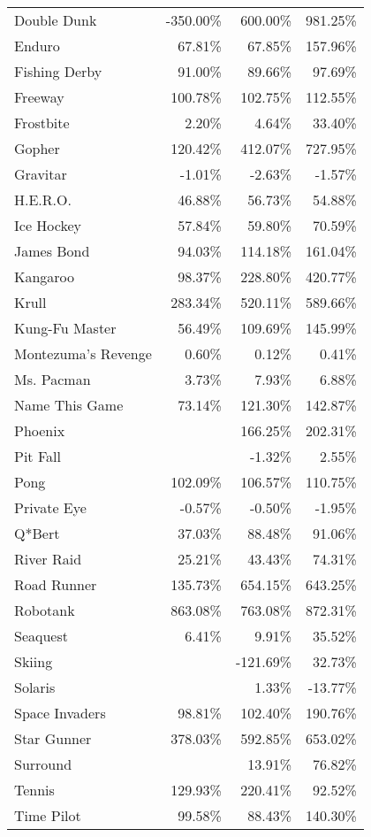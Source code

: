 \documentclass[letterpaper]{article}
\begin{document}
\begin{table*}[h]
\begin{tabular}{lrrr}
Double Dunk & -350.00\% & 600.00\% & 981.25\% \\
Enduro & 67.81\% & 67.85\% & 157.96\% \\
Fishing Derby & 91.00\% & 89.66\% & 97.69\% \\
Freeway & 100.78\% & 102.75\% & 112.55\% \\
Frostbite & 2.20\% & 4.64\% & 33.40\% \\
Gopher & 120.42\% & 412.07\% & 727.95\% \\
Gravitar & -1.01\% & -2.63\% & -1.57\% \\
H.E.R.O. & 46.88\% & 56.73\% & 54.88\% \\
Ice Hockey & 57.84\% & 59.80\% & 70.59\% \\
James Bond & 94.03\% & 114.18\% & 161.04\% \\
Kangaroo & 98.37\% & 228.80\% & 420.77\% \\
Krull & 283.34\% & 520.11\% & 589.66\% \\
Kung-Fu Master & 56.49\% & 109.69\% & 145.99\% \\
Montezuma's Revenge & 0.60\% & 0.12\% & 0.41\% \\
Ms. Pacman & 3.73\% & 7.93\% & 6.88\% \\
Name This Game & 73.14\% & 121.30\% & 142.87\% \\
Phoenix &  & 166.25\% & 202.31\% \\
Pit Fall &  & -1.32\% & 2.55\% \\
Pong & 102.09\% & 106.57\% & 110.75\% \\
Private Eye & -0.57\% & -0.50\% & -1.95\% \\
Q*Bert & 37.03\% & 88.48\% & 91.06\% \\
River Raid & 25.21\% & 43.43\% & 74.31\% \\
Road Runner & 135.73\% & 654.15\% & 643.25\% \\
Robotank & 863.08\% & 763.08\% & 872.31\% \\
Seaquest & 6.41\% & 9.91\% & 35.52\% \\
Skiing &  & -121.69\% & 32.73\% \\
Solaris &  & 1.33\% & -13.77\% \\
Space Invaders & 98.81\% & 102.40\% & 190.76\% \\
Star Gunner & 378.03\% & 592.85\% & 653.02\% \\
Surround &  & 13.91\% & 76.82\% \\
Tennis & 129.93\% & 220.41\% & 92.52\% \\
Time Pilot & 99.58\% & 88.43\% & 140.30\% \\

\end{tabular}
\end{table*}
\end{document}
